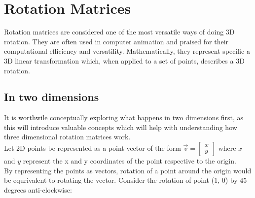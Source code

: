 \documentclass[12pt, a4paper]{article}
\begin{document}
\pagebreak

\section{Rotation Matrices}
Rotation matrices are considered one of the most versatile ways of doing 3D
rotation. They are often used in computer animation and praised for their
computational efficiency and versatility. Mathematically, they represent
specific a 3D linear transformation which, when applied to a set of points,
describes a 3D rotation.

\subsection{In two dimensions}
It is worthwile conceptually exploring what happens in two dimensions first, as
this will introduce valuable concepts which will help with understanding how
three dimensional rotation matrices work. \\

Let 2D points be represented as a point vector of the form $\vec{v} =
        \begin{bmatrix}x \\ y\end{bmatrix}$ where $x$ and $y$ represent the x
        and y coordinates of the point respective to the origin. \\

By representing the points as vectors, rotation of a point around the origin
would be equrivalent to rotating the vector. Consider the rotation of point (1,
0) by 45 degrees anti-clockwise:
\end{document}
